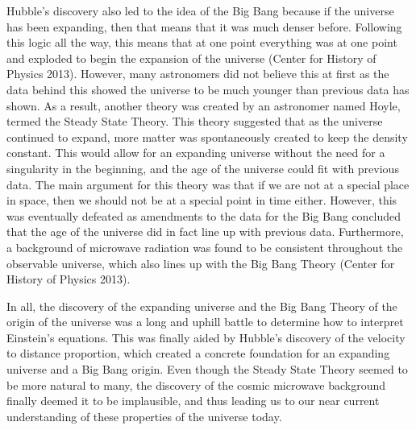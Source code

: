\documentclass[12pt]{article}
\begin{document}
Hubble's
discovery also led to the idea of the Big Bang because if the universe has been
expanding, then that means that it was much denser before.  Following this logic
all the way, this means that at one point everything was at one point and
exploded to begin the expansion of the universe (Center for History of Physics
2013).  However, many astronomers did not believe this at first as the data
behind this showed the universe to be much younger than previous data has shown.
As a result, another theory was created by an astronomer named Hoyle, termed the
Steady State Theory.  This theory suggested that as the universe continued to
expand, more matter was spontaneously created to keep the density constant.
This would allow for an expanding universe without the need for a singularity in
the beginning, and the age of the universe could fit with previous data.  The
main argument for this theory was that if we are not at a special place in
space, then we should not be at a special point in time either.  However, this
was eventually defeated as amendments to the data for the Big Bang concluded
that the age of the universe did in fact line up with previous data.
Furthermore, a background of microwave radiation was found to be consistent
throughout the observable universe, which also lines up with the Big Bang
Theory (Center for History of Physics 2013).

In all, the discovery of the expanding universe and the Big Bang Theory of the
origin of the universe was a long and uphill battle to determine how to
interpret Einstein's equations.  This was finally aided by Hubble's discovery of
the velocity to distance proportion, which created a concrete foundation for an
expanding universe and a Big Bang origin.  Even though the Steady State Theory
seemed to be more natural to many, the discovery of the cosmic microwave
background finally deemed it to be implausible, and thus leading us to our
near current understanding of these properties of the universe today.
\end{document}
